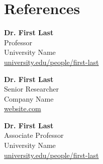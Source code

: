 \documentclass[10pt,letterpaper]{article}
\newcommand{\weblink}[2]{\href{#1}{\textcolor{linkblue}{#2}}}
\begin{document}
\section{References}
\begin{minipage}[t]{0.32\linewidth}\textbf{Dr. First Last}\\Professor\\University Name\\\weblink{https://university.edu}{university.edu/people/first-last}\end{minipage}\hfill
\begin{minipage}[t]{0.32\linewidth}\textbf{Dr. First Last}\\Senior Researcher\\Company Name\\\weblink{https://website.com}{website.com}\end{minipage}\hfill
\begin{minipage}[t]{0.32\linewidth}\textbf{Dr. First Last}\\Associate Professor\\University Name\\\weblink{https://university.edu}{university.edu/people/first-last}\end{minipage}
\end{document}
